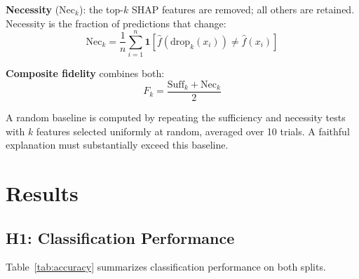 \documentclass[journal,10pt,twocolumn]{IEEEtran}
\begin{document}
\textbf{Necessity} ($\mathrm{Nec}_k$): the top-$k$ SHAP features are
removed; all others are retained.  Necessity is the fraction of
predictions that change:
\begin{equation}
  \mathrm{Nec}_k
    = \frac{1}{n}\sum_{i=1}^{n}
      \mathbf{1}\!\left[\hat{f}\!\left(\mathrm{drop}_k(x_i)\right)
        \neq \hat{f}(x_i)\right]
  \label{eq:necessity}
\end{equation}

\textbf{Composite fidelity} combines both:
\begin{equation}
  F_k = \frac{\mathrm{Suff}_k + \mathrm{Nec}_k}{2}
  \label{eq:fidelity}
\end{equation}

A random baseline is computed by repeating the sufficiency and
necessity tests with $k$ features selected uniformly at random, averaged
over 10 trials.  A faithful explanation must substantially exceed this
baseline.

\section{Results}
\label{sec:results}

\subsection{H1: Classification Performance}
\label{sec:results_h1}

Table~\ref{tab:accuracy} summarizes classification performance on both
splits.

\begin{table}[h]
\centering
\caption{Classification Performance on Test Set (8{,}980 articles)}
\label{tab:accuracy}
\end{table}
\end{document}
